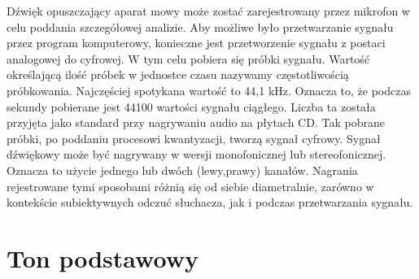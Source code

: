 \documentclass[a4paper,12 pt]{report}
\begin{document}
Dźwięk opuszczający aparat mowy może zostać zarejestrowany przez mikrofon w celu poddania szczegółowej analizie. Aby możliwe było przetwarzanie sygnału przez program komputerowy, konieczne jest przetworzenie sygnału z postaci analogowej do cyfrowej. W tym celu pobiera się próbki sygnału. Wartość określającą ilość próbek w jednostce czasu nazywamy częstotliwością próbkowania. Najczęściej spotykana wartość to 44,1 kHz. Oznacza to, że podczas sekundy pobierane jest 44100 wartości sygnału ciągłego. Liczba ta została przyjęta jako standard przy nagrywaniu audio na płytach CD. Tak pobrane próbki, po poddaniu procesowi kwantyzacji, tworzą sygnał cyfrowy.
Sygnał dźwiękowy może być nagrywany w wersji monofonicznej lub stereofonicznej. Oznacza to użycie jednego lub dwóch (lewy,prawy) kanałów. Nagrania rejestrowane tymi sposobami różnią się od siebie diametralnie, zarówno w kontekście subiektywnych odczuć słuchacza, jak i podczas przetwarzania sygnału.





\section{Ton podstawowy}
\end{document}
